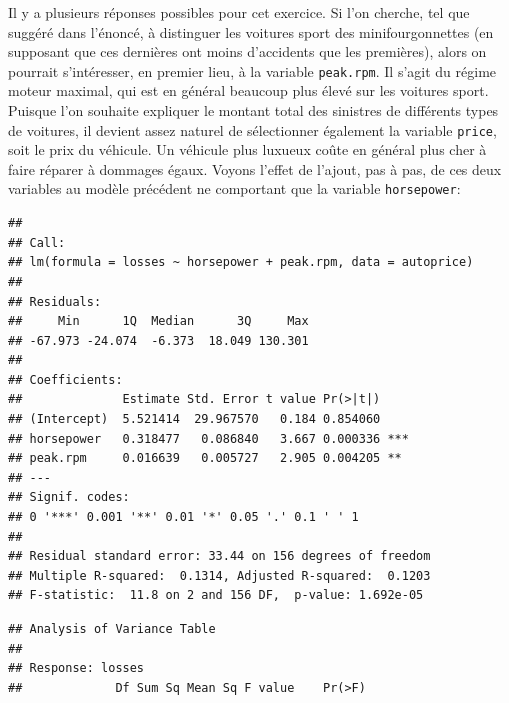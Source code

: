 \begin{solution}{3.9}
    Il y a plusieurs réponses possibles pour cet exercice. Si l'on
    cherche, tel que suggéré dans l'énoncé, à distinguer les voitures
    sport des minifourgonnettes (en supposant que ces dernières ont
    moins d'accidents que les premières), alors on pourrait
    s'intéresser, en premier lieu, à la variable \texttt{peak.rpm}. Il
    s'agit du régime moteur maximal, qui est en général beaucoup plus
    élevé sur les voitures sport. Puisque l'on souhaite expliquer le
    montant total des sinistres de différents types de voitures, il
    devient assez naturel de sélectionner également la variable
    \texttt{price}, soit le prix du véhicule. Un véhicule plus luxueux
    coûte en général plus cher à faire réparer à dommages égaux.
    Voyons l'effet de l'ajout, pas à pas, de ces deux variables au
    modèle précédent ne comportant que la variable
    \texttt{horsepower}:
\begin{knitrout}
\color{fgcolor}\begin{kframe}
\begin{alltt}
 \hlkwb{<-} \hlstd{(}\hlstd{,}  \hlstd{=} \hlstd{)}
 \hlkwb{<-}  \hlopt{~}  \hlopt{+}   
\end{alltt}
\begin{verbatim}
##
## Call:
## lm(formula = losses ~ horsepower + peak.rpm, data = autoprice)
##
## Residuals:
##     Min      1Q  Median      3Q     Max
## -67.973 -24.074  -6.373  18.049 130.301
##
## Coefficients:
##              Estimate Std. Error t value Pr(>|t|)
## (Intercept)  5.521414  29.967570   0.184 0.854060
## horsepower   0.318477   0.086840   3.667 0.000336 ***
## peak.rpm     0.016639   0.005727   2.905 0.004205 **
## ---
## Signif. codes:
## 0 '***' 0.001 '**' 0.01 '*' 0.05 '.' 0.1 ' ' 1
##
## Residual standard error: 33.44 on 156 degrees of freedom
## Multiple R-squared:  0.1314,	Adjusted R-squared:  0.1203
## F-statistic:  11.8 on 2 and 156 DF,  p-value: 1.692e-05
\end{verbatim}
\begin{alltt}
\end{alltt}
\begin{verbatim}
## Analysis of Variance Table
##
## Response: losses
##             Df Sum Sq Mean Sq F value    Pr(>F)

\end{verbatim}
\end{kframe}
\end{knitrout}
\end{solution}
